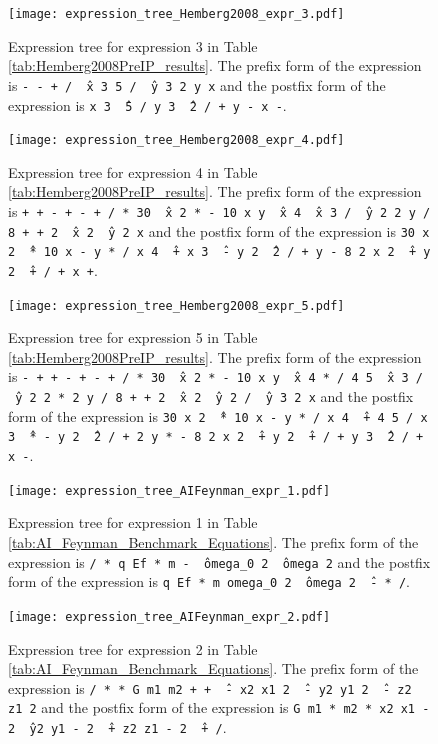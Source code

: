 \documentclass[12pt]{iopart}
\begin{document}
\begin{figure}
    \centering
    \texttt{[image: expression\_tree\_Hemberg2008\_expr\_3.pdf]}
    \caption{Expression tree for expression 3 in Table \ref{tab:Hemberg2008PreIP_results}. The prefix form of the expression is \texttt{- - + / \^\ x 3 5 / \^\ y 3 2 y x} and the postfix form of the expression is \texttt{x 3 \^\ 5 / y 3 \^\ 2 / + y - x -}. } 
    \label{fig:expression_tree_Hemberg2008_expr_3}
\end{figure}

\begin{figure}
    \centering
    \texttt{[image: expression\_tree\_Hemberg2008\_expr\_4.pdf]}
    \caption{Expression tree for expression 4 in Table \ref{tab:Hemberg2008PreIP_results}.  The prefix form of the expression is \texttt{+ + - + - + / * 30 \^\ x 2 * - 10 x y \^\ x 4 \^\ x 3 / \^\ y 2 2 y / 8 + + 2 \^\ x 2 \^\ y 2 x} and the postfix form of the expression is \texttt{30 x 2 \^\ * 10 x - y * / x 4 \^\ + x 3 \^\ - y 2 \^\ 2 / + y - 8 2 x 2 \^\ + y 2 \^\ + / + x +}. } 
    \label{fig:expression_tree_Hemberg2008_expr_4}
\end{figure}

\begin{figure}
    \centering
    \texttt{[image: expression\_tree\_Hemberg2008\_expr\_5.pdf]}
    \caption{Expression tree for expression 5 in Table \ref{tab:Hemberg2008PreIP_results}. The prefix form of the expression is \texttt{- + + - + - + / * 30 \^\ x 2 * - 10 x y \^\ x 4 * / 4 5 \^\ x 3 / \^\ y 2 2 * 2 y / 8 + + 2 \^\ x 2 \^\ y 2 / \^\ y 3 2 x} and the postfix form of the expression is \texttt{30 x 2 \^\ * 10 x - y * / x 4 \^\ + 4 5 / x 3 \^\ * - y 2 \^\ 2 / + 2 y * - 8 2 x 2 \^\ + y 2 \^\ + / + y 3 \^\ 2 / + x -}. } 
    \label{fig:expression_tree_Hemberg2008_expr_5}
\end{figure}

\begin{figure}
    \centering
    \texttt{[image: expression\_tree\_AIFeynman\_expr\_1.pdf]}
    \caption{Expression tree for expression 1 in Table \ref{tab:AI_Feynman_Benchmark_Equations}. The prefix form of the expression is \texttt{/ * q Ef * m - \^\ omega\_0 2 \^\ omega 2} and the postfix form of the expression is \texttt{q Ef * m omega\_0 2 \^\ omega 2 \^\ - *  /}. }
    \label{fig:expression_tree_AIFeynman_expr_1}
\end{figure}

\begin{figure}
    \centering
    \texttt{[image: expression\_tree\_AIFeynman\_expr\_2.pdf]}
    \caption{Expression tree for expression 2 in Table \ref{tab:AI_Feynman_Benchmark_Equations}. The prefix form of the expression is \texttt{/ * * G m1 m2 + + \^\ - x2 x1 2 \^\ - y2 y1 2 \^\ - z2 z1 2} and the postfix form of the expression is \texttt{G m1 * m2 * x2 x1 - 2 \^\ y2 y1 - 2 \^\ + z2 z1 - 2 \^\ +  /}. } 
    \label{fig:expression_tree_AIFeynman_expr_2}
\end{figure}
\end{document}
